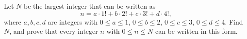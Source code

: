 Let $N$ be the largest integer that can be written as
\[
n=a\cdot1!+b\cdot2!+c\cdot3!+d\cdot4!,
\]
where $a,b,c,d$ are integers with $0\le a\le1$, $0\le b\le2$, $0\le c\le3$, $0\le d\le4$. Find $N$, and prove that every integer $n$ with $0\le n\le N$ can be written in this form.
